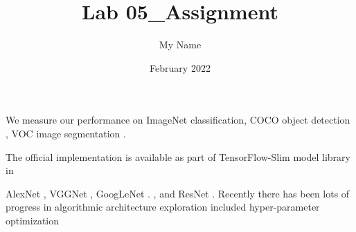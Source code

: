 \documentclass{article}
\title{Lab 05_Assignment}
\author{My Name}
\date{February 2022}
\begin{document}
We measure our performance on ImageNet \cite{russakovsky2015imagenet} classification, COCO object detection \cite{lin2014microsoft}, VOC image segmentation \cite{williams2014pascal}.

The official implementation is available as part of TensorFlow-Slim model library in \cite{code}

AlexNet \cite{krizhevsky2012imagenet}, VGGNet \cite{simonyan2014very}, GoogLeNet \cite{szegedy2015going}. , and
ResNet \cite{he2016deep}. Recently there has been lots of progress in algorithmic architecture exploration included hyper-parameter optimization \cite{bergstra2012random} \cite{snoek2012practical}



\end{document}
